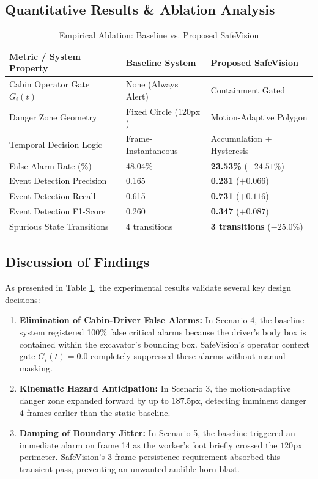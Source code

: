 \documentclass[letterpaper, 10 pt, conference]{ieeeconf}
\begin{document}
\subsection{Quantitative Results & Ablation Analysis}

\begin{table}[h]
\caption{Empirical Ablation: Baseline vs. Proposed SafeVision}
\label{tab:ablation}
\centering
\small
\begin{tabularx}{\columnwidth}{lXX}
\toprule
\textbf{Metric / System Property} & \textbf{Baseline System} & \textbf{Proposed SafeVision} \\
\midrule
Cabin Operator Gate $G_i(t)$ & None (Always Alert) & Containment Gated \\
Danger Zone Geometry & Fixed Circle ($120\text{px}$) & Motion-Adaptive Polygon \\
Temporal Decision Logic & Frame-Instantaneous & Accumulation + Hysteresis \\
\midrule
False Alarm Rate (\%) & 48.04\% & \textbf{23.53\%} ($-24.51\%$) \\
Event Detection Precision & 0.165 & \textbf{0.231} ($+0.066$) \\
Event Detection Recall & 0.615 & \textbf{0.731} ($+0.116$) \\
Event Detection F1-Score & 0.260 & \textbf{0.347} ($+0.087$) \\
Spurious State Transitions & 4 transitions & \textbf{3 transitions} ($-25.0\%$) \\
\bottomrule
\end{tabularx}
\end{table}

\subsection{Discussion of Findings}
As presented in Table \ref{tab:ablation}, the experimental results validate several key design decisions:
\begin{enumerate}
    \item \textbf{Elimination of Cabin-Driver False Alarms:} In Scenario 4, the baseline system registered 100\% false critical alarms because the driver's body box is contained within the excavator's bounding box. SafeVision's operator context gate $G_i(t) = 0.0$ completely suppressed these alarms without manual masking.
    \item \textbf{Kinematic Hazard Anticipation:} In Scenario 3, the motion-adaptive danger zone expanded forward by up to $187.5\text{px}$, detecting imminent danger 4 frames earlier than the static baseline.
    \item \textbf{Damping of Boundary Jitter:} In Scenario 5, the baseline triggered an immediate alarm on frame 14 as the worker's foot briefly crossed the $120\text{px}$ perimeter. SafeVision's 3-frame persistence requirement absorbed this transient pass, preventing an unwanted audible horn blast.
\end{enumerate}
\end{document}
